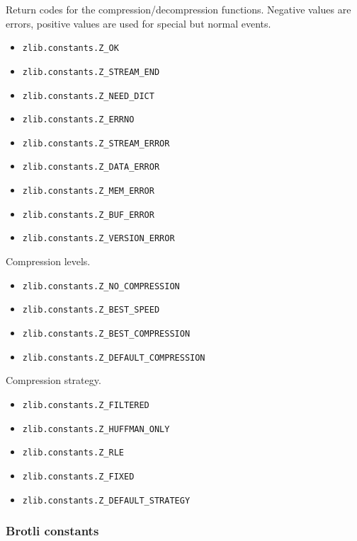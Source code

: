 Return codes for the compression/decompression functions. Negative
values are errors, positive values are used for special but normal
events.

\begin{itemize}
\tightlist
\item
  \texttt{zlib.constants.Z\_OK}
\item
  \texttt{zlib.constants.Z\_STREAM\_END}
\item
  \texttt{zlib.constants.Z\_NEED\_DICT}
\item
  \texttt{zlib.constants.Z\_ERRNO}
\item
  \texttt{zlib.constants.Z\_STREAM\_ERROR}
\item
  \texttt{zlib.constants.Z\_DATA\_ERROR}
\item
  \texttt{zlib.constants.Z\_MEM\_ERROR}
\item
  \texttt{zlib.constants.Z\_BUF\_ERROR}
\item
  \texttt{zlib.constants.Z\_VERSION\_ERROR}
\end{itemize}

Compression levels.

\begin{itemize}
\tightlist
\item
  \texttt{zlib.constants.Z\_NO\_COMPRESSION}
\item
  \texttt{zlib.constants.Z\_BEST\_SPEED}
\item
  \texttt{zlib.constants.Z\_BEST\_COMPRESSION}
\item
  \texttt{zlib.constants.Z\_DEFAULT\_COMPRESSION}
\end{itemize}

Compression strategy.

\begin{itemize}
\tightlist
\item
  \texttt{zlib.constants.Z\_FILTERED}
\item
  \texttt{zlib.constants.Z\_HUFFMAN\_ONLY}
\item
  \texttt{zlib.constants.Z\_RLE}
\item
  \texttt{zlib.constants.Z\_FIXED}
\item
  \texttt{zlib.constants.Z\_DEFAULT\_STRATEGY}
\end{itemize}

\subsubsection{Brotli constants}\label{brotli-constants}

